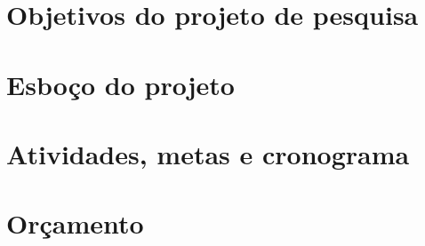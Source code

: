\section{Objetivos do projeto de pesquisa}
\label{sec:obj}

\newpage

\section{Esboço do projeto}
\label{sec:proj}

\newpage

\section{Atividades, metas e cronograma}
\label{sec:cronos}

\newpage

\section{Orçamento}
\label{sec:orc}
%
\newpage

\printbibliography


